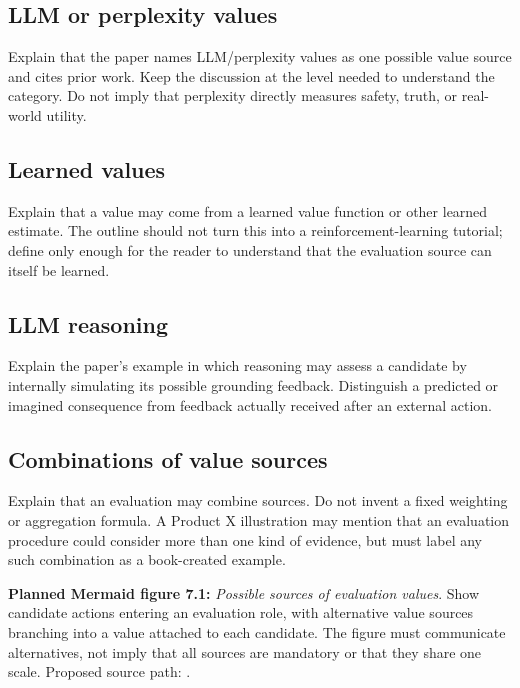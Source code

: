 \subsection{LLM or perplexity values}
Explain that the paper names LLM/perplexity values as one possible value source and cites prior work. Keep the discussion at the level needed to understand the category. Do not imply that perplexity directly measures safety, truth, or real-world utility.
\subsection{Learned values}
Explain that a value may come from a learned value function or other learned estimate. The outline should not turn this into a reinforcement-learning tutorial; define only enough for the reader to understand that the evaluation source can itself be learned.
\subsection{LLM reasoning}
Explain the paper's example in which reasoning may assess a candidate by internally simulating its possible grounding feedback. Distinguish a predicted or imagined consequence from feedback actually received after an external action.
\subsection{Combinations of value sources}
Explain that an evaluation may combine sources. Do not invent a fixed weighting or aggregation formula. A Product X illustration may mention that an evaluation procedure could consider more than one kind of evidence, but must label any such combination as a book-created example.

\textbf{Planned Mermaid figure 7.1:} \emph{Possible sources of evaluation values}. Show candidate actions entering an evaluation role, with alternative value sources branching into a value attached to each candidate. The figure must communicate alternatives, not imply that all sources are mandatory or that they share one scale. Proposed source path: .

